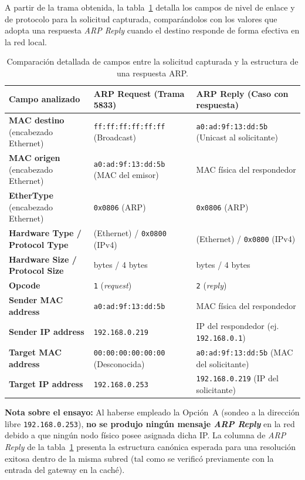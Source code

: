 \documentclass[12pt,a4paper]{article}
\begin{document}
A partir de la trama obtenida, la tabla~\ref{tab:arp-campos} detalla los campos de nivel de enlace y de protocolo para la solicitud capturada, comparándolos con los valores que adopta una respuesta \emph{ARP Reply} cuando el destino responde de forma efectiva en la red local.

\begin{table}[H]
\centering\small
\setlength{\tabcolsep}{5pt}
\begin{tabular}{@{}>{\raggedright\arraybackslash}p{4.8cm}>{\raggedright\arraybackslash}p{4.8cm}>{\raggedright\arraybackslash}p{4.8cm}@{}}
\toprule
\textbf{Campo analizado} & \textbf{ARP Request (Trama 5833)} & \textbf{ARP Reply (Caso con respuesta)} \\
\midrule
\textbf{MAC destino} (encabezado Ethernet) & \texttt{ff:ff:ff:ff:ff:ff} (Broadcast) & \texttt{a0:ad:9f:13:dd:5b} (Unicast al solicitante) \\
\textbf{MAC origen} (encabezado Ethernet) & \texttt{a0:ad:9f:13:dd:5b} (MAC del emisor) & MAC física del respondedor \\
\textbf{EtherType} (encabezado Ethernet) & \texttt{0x0806} (ARP) & \texttt{0x0806} (ARP) \\
\textbf{Hardware Type / Protocol Type} & 1 (Ethernet) / \texttt{0x0800} (IPv4) & 1 (Ethernet) / \texttt{0x0800} (IPv4) \\
\textbf{Hardware Size / Protocol Size} & 6 bytes / 4 bytes & 6 bytes / 4 bytes \\
\textbf{Opcode} & \texttt{1} (\emph{request}) & \texttt{2} (\emph{reply}) \\
\textbf{Sender MAC address} & \texttt{a0:ad:9f:13:dd:5b} & MAC física del respondedor \\
\textbf{Sender IP address} & \texttt{192.168.0.219} & IP del respondedor (ej. \texttt{192.168.0.1}) \\
\textbf{Target MAC address} & \texttt{00:00:00:00:00:00} (Desconocida) & \texttt{a0:ad:9f:13:dd:5b} (MAC del solicitante) \\
\textbf{Target IP address} & \texttt{192.168.0.253} & \texttt{192.168.0.219} (IP del solicitante) \\
\bottomrule
\end{tabular}
\caption{Comparación detallada de campos entre la solicitud capturada y la estructura de una respuesta ARP.}
\label{tab:arp-campos}
\end{table}

\textbf{Nota sobre el ensayo:} Al haberse empleado la Opción~A (sondeo a la dirección libre \texttt{192.168.0.253}), \textbf{no se produjo ningún mensaje \emph{ARP Reply}} en la red debido a que ningún nodo físico posee asignada dicha IP. La columna de \emph{ARP Reply} de la tabla~\ref{tab:arp-campos} presenta la estructura canónica esperada para una resolución exitosa dentro de la misma subred (tal como se verificó previamente con la entrada del gateway en la caché).
\end{document}

